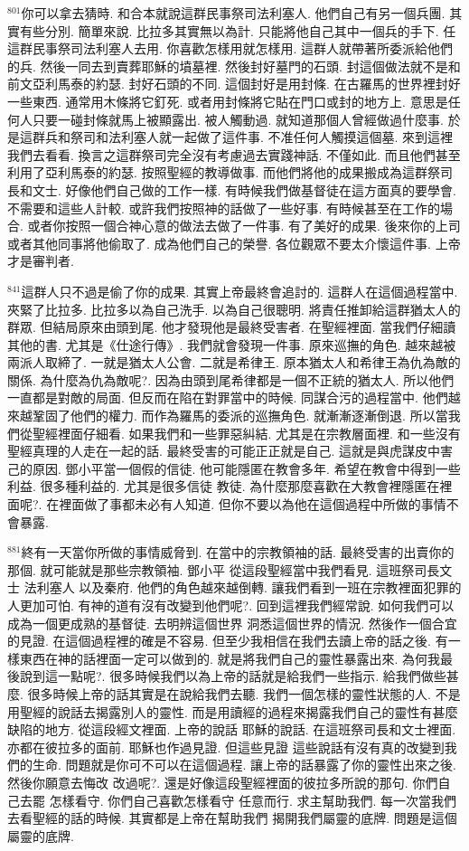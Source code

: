 \documentclass{book}
\begin{document}
$^{801}$你可以拿去猜時.
和合本就說這群民事祭司法利塞人.
他們自己有另一個兵團.
其實有些分別.
簡單來說.
比拉多其實無以為計.
只能將他自己其中一個兵的手下.
任這群民事祭司法利塞人去用.
你喜歡怎樣用就怎樣用.
這群人就帶著所委派給他們的兵.
然後一同去到賣葬耶穌的墳墓裡.
然後封好墓門的石頭.
封這個做法就不是和前文亞利馬泰的約瑟.
封好石頭的不同.
這個封好是用封條.
在古羅馬的世界裡封好一些東西.
通常用木條將它釘死.
或者用封條將它貼在門口或封的地方上.
意思是任何人只要一碰封條就馬上被顯露出.
被人觸動過.
就知道那個人曾經做過什麼事.
於是這群兵和祭司和法利塞人就一起做了這件事.
不准任何人觸摸這個墓.
來到這裡我們去看看.
換言之這群祭司完全沒有考慮過去實踐神話.
不僅如此.
而且他們甚至利用了亞利馬泰的約瑟.
按照聖經的教導做事.
而他們將他的成果搬成為這群祭司長和文士.
好像他們自己做的工作一樣.
有時候我們做基督徒在這方面真的要學會.
不需要和這些人計較.
或許我們按照神的話做了一些好事.
有時候甚至在工作的場合.
或者你按照一個合神心意的做法去做了一件事.
有了美好的成果.
後來你的上司或者其他同事將他偷取了.
成為他們自己的榮譽.
各位觀眾不要太介懷這件事.
上帝才是審判者.

$^{841}$這群人只不過是偷了你的成果.
其實上帝最終會追討的.
這群人在這個過程當中.
夾緊了比拉多.
比拉多以為自己洗手.
以為自己很聰明.
將責任推卸給這群猶太人的群眾.
但結局原來由頭到尾.
他才發現他是最終受害者.
在聖經裡面.
當我們仔細讀其他的書.
尤其是《仕途行傳》.
我們就會發現一件事.
原來巡撫的角色.
越來越被兩派人取締了.
一就是猶太人公會.
二就是希律王.
原本猶太人和希律王為仇為敵的關係.
為什麼為仇為敵呢?.
因為由頭到尾希律都是一個不正統的猶太人.
所以他們一直都是對敵的局面.
但反而在陷在對罪當中的時候.
同謀合污的過程當中.
他們越來越鞏固了他們的權力.
而作為羅馬的委派的巡撫角色.
就漸漸逐漸倒退.
所以當我們從聖經裡面仔細看.
如果我們和一些罪惡糾結.
尤其是在宗教層面裡.
和一些沒有聖經真理的人走在一起的話.
最終受害的可能正正就是自己.
這就是與虎謀皮中害己的原因.
鄧小平當一個假的信徒.
他可能隱匿在教會多年.
希望在教會中得到一些利益.
很多種利益的.
尤其是很多信徒 教徒.
為什麼那麼喜歡在大教會裡隱匿在裡面呢?.
在裡面做了事都未必有人知道.
但你不要以為他在這個過程中所做的事情不會暴露.

$^{881}$終有一天當你所做的事情威脅到.
在當中的宗教領袖的話.
最終受害的出賣你的那個.
就可能就是那些宗教領袖.
鄧小平 從這段聖經當中我們看見.
這班祭司長文士 法利塞人 以及秦府.
他們的角色越來越倒轉.
讓我們看到一班在宗教裡面犯罪的人更加可怕.
有神的道有沒有改變到他們呢?.
回到這裡我們經常說.
如何我們可以成為一個更成熟的基督徒.
去明辨這個世界 洞悉這個世界的情況.
然後作一個合宜的見證.
在這個過程裡的確是不容易.
但至少我相信在我們去讀上帝的話之後.
有一樣東西在神的話裡面一定可以做到的.
就是將我們自己的靈性暴露出來.
為何我最後說到這一點呢?.
很多時候我們以為上帝的話就是給我們一些指示.
給我們做些甚麼.
很多時候上帝的話其實是在說給我們去聽.
我們一個怎樣的靈性狀態的人.
不是用聖經的說話去揭露別人的靈性.
而是用讀經的過程來揭露我們自己的靈性有甚麼缺陷的地方.
從這段經文裡面.
上帝的說話 耶穌的說話.
在這班祭司長和文士裡面.
亦都在彼拉多的面前.
耶穌也作過見證.
但這些見證 這些說話有沒有真的改變到我們的生命.
問題就是你可不可以在這個過程.
讓上帝的話暴露了你的靈性出來之後.
然後你願意去悔改 改過呢?.
還是好像這段聖經裡面的彼拉多所說的那句.
你們自己去罷 怎樣看守.
你們自己喜歡怎樣看守 任意而行.
求主幫助我們.
每一次當我們去看聖經的話的時候.
其實都是上帝在幫助我們 揭開我們屬靈的底牌.
問題是這個屬靈的底牌.
\end{document}
